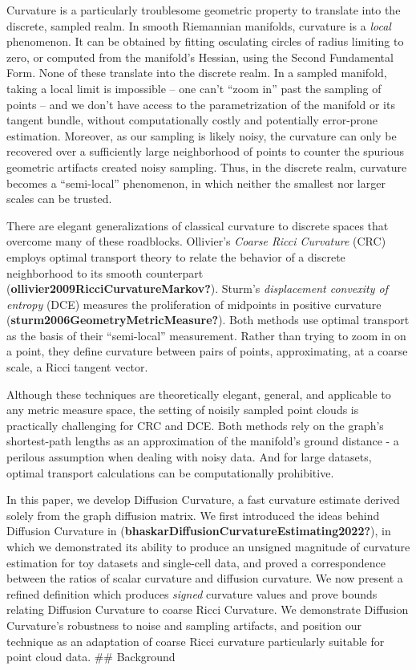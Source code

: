 \documentclass[
]{agujournal2019}
\begin{document}
Curvature is a particularly troublesome geometric property to translate
into the discrete, sampled realm. In smooth Riemannian manifolds,
curvature is a \emph{local} phenomenon. It can be obtained by fitting
osculating circles of radius limiting to zero, or computed from the
manifold's Hessian, using the Second Fundamental Form. None of these
translate into the discrete realm. In a sampled manifold, taking a local
limit is impossible -- one can't ``zoom in'' past the sampling of points
-- and we don't have access to the parametrization of the manifold or
its tangent bundle, without computationally costly and potentially
error-prone estimation. Moreover, as our sampling is likely noisy, the
curvature can only be recovered over a sufficiently large neighborhood
of points to counter the spurious geometric artifacts created noisy
sampling. Thus, in the discrete realm, curvature becomes a
``semi-local'' phenomenon, in which neither the smallest nor larger
scales can be trusted.

There are elegant generalizations of classical curvature to discrete
spaces that overcome many of these roadblocks. Ollivier's \emph{Coarse
Ricci Curvature} (CRC) employs optimal transport theory to relate the
behavior of a discrete neighborhood to its smooth counterpart
(\textbf{ollivier2009RicciCurvatureMarkov?}). Sturm's \emph{displacement
convexity of entropy} (DCE) measures the proliferation of midpoints in
positive curvature (\textbf{sturm2006GeometryMetricMeasure?}). Both
methods use optimal transport as the basis of their ``semi-local''
measurement. Rather than trying to zoom in on a point, they define
curvature between pairs of points, approximating, at a coarse scale, a
Ricci tangent vector.

Although these techniques are theoretically elegant, general, and
applicable to any metric measure space, the setting of noisily sampled
point clouds is practically challenging for CRC and DCE. Both methods
rely on the graph's shortest-path lengths as an approximation of the
manifold's ground distance - a perilous assumption when dealing with
noisy data. And for large datasets, optimal transport calculations can
be computationally prohibitive.

In this paper, we develop Diffusion Curvature, a fast curvature estimate
derived solely from the graph diffusion matrix. We first introduced the
ideas behind Diffusion Curvature in
(\textbf{bhaskarDiffusionCurvatureEstimating2022?}), in which we
demonstrated its ability to produce an unsigned magnitude of curvature
estimation for toy datasets and single-cell data, and proved a
correspondence between the ratios of scalar curvature and diffusion
curvature. We now present a refined definition which produces
\emph{signed} curvature values and prove bounds relating Diffusion
Curvature to coarse Ricci Curvature. We demonstrate Diffusion
Curvature's robustness to noise and sampling artifacts, and position our
technique as an adaptation of coarse Ricci curvature particularly
suitable for point cloud data. \#\# Background
\end{document}
